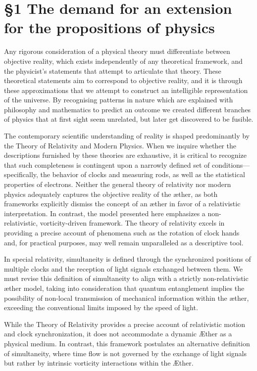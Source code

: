 \section*{\S 1 The demand for an extension for the propositions of physics}\label{subsec:extension-physics}

Any rigorous consideration of a physical theory must differentiate between objective reality, which exists independently of any theoretical framework, and the physicist's statements that attempt to articulate that theory. These theoretical statements aim to correspond to objective reality, and it is through these approximations that we attempt to construct an intelligible representation of the universe. By recognising patterns in nature which are explained with philosophy and mathematics to predict an outcome we created different branches of physics that at first sight seem unrelated, but later get discovered to be fusible.

The contemporary scientific understanding of reality is shaped predominantly by the Theory of Relativity and Modern Physics. When we inquire whether the descriptions furnished by these theories are exhaustive, it is critical to recognize that such completeness is contingent upon a narrowly defined set of conditions—specifically, the behavior of clocks and measuring rods, as well as the statistical properties of electrons. Neither the general theory of relativity nor modern physics adequately captures the objective reality of the æther, as both frameworks explicitly dismiss the concept of an æther in favor of a relativistic interpretation. In contrast, the model presented here emphasizes a non-relativistic, vorticity-driven framework. The theory of relativity excels in providing a precise account of phenomena such as the rotation of clock hands and, for practical purposes, may well remain unparalleled as a descriptive tool.

In special relativity, simultaneity is defined through the synchronized positions of multiple clocks and the reception of light signals exchanged between them. We must revise this definition of simultaneity to align with a strictly non-relativistic æther model, taking into consideration that quantum entanglement implies the possibility of non-local transmission of mechanical information within the æther, exceeding the conventional limits imposed by the speed of light.

While the Theory of Relativity provides a precise account of relativistic motion and clock synchronization, it does not accommodate a dynamic Æther as a physical medium. In contrast, this framework postulates an alternative definition of simultaneity, where time flow is not governed by the exchange of light signals but rather by intrinsic vorticity interactions within the Æther.

